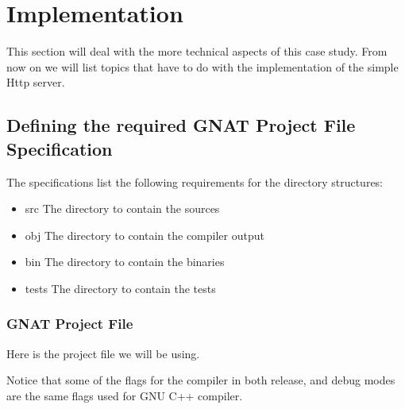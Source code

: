 \section{Implementation}
This section will deal with the more technical aspects of this case study. From
now on we will list topics that have to do with the implementation of the simple
Http server.

\subsection{Defining the required GNAT Project File Specification}
The specifications list the following requirements for the directory structures: 
\begin{itemize}
  \item{src} The directory to contain the sources
  \item{obj} The directory to contain the compiler output
  \item{bin} The directory to contain the binaries
  \item{tests} The directory to contain the tests
\end{itemize}

\subsubsection{GNAT Project File}
Here is the project file we will be using.

Notice that some of the flags for the compiler in both release, and debug modes 
are the same flags used for GNU C++ compiler.
